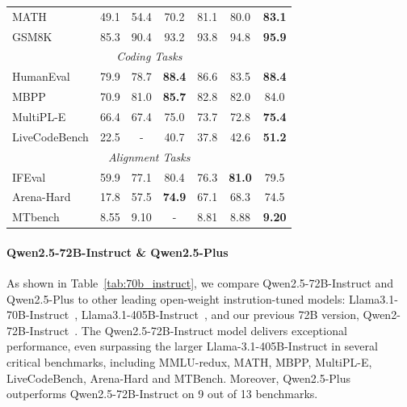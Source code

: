 \begin{table}[tbp]
\begin{tabular}{@{}lcccccc@{}}
MATH & 49.1 & 54.4 & 70.2 & 81.1 & 80.0 & \textbf{83.1} \\

GSM8K & 85.3 & 90.4 & 93.2 & 93.8 & 94.8 & \textbf{95.9} \\

\midrule

\multicolumn{7}{c}{\textit{Coding Tasks}} \\

\midrule

HumanEval & 79.9 & 78.7 & \textbf{88.4} & 86.6 & 83.5 & \textbf{88.4} \\

MBPP & 70.9 & 81.0 & \textbf{85.7} & 82.8 & 82.0 & 84.0 \\

MultiPL-E & 66.4 & 67.4 & 75.0 & 73.7 & 72.8 & \textbf{75.4} \\

LiveCodeBench & 22.5 & - & 40.7 & 37.8 & 42.6 & \textbf{51.2} \\

\midrule

\multicolumn{7}{c}{\textit{Alignment Tasks}} \\

\midrule

IFEval & 59.9 & 77.1 & 80.4 & 76.3 & \textbf{81.0} & 79.5 \\

Arena-Hard & 17.8 & 57.5 & \textbf{74.9} & 67.1 & 68.3 & 74.5 \\


MTbench & 8.55 & 9.10 & - & 8.81 & 8.88 & \textbf{9.20} \\

\bottomrule

\end{tabular}

\end{table}





\paragraph{Qwen2.5-72B-Instruct \& Qwen2.5-Plus} 
As shown in Table~\ref{tab:70b_instruct}, we compare Qwen2.5-72B-Instruct and Qwen2.5-Plus to other leading open-weight instrution-tuned models: Llama3.1-70B-Instruct~\citep{llama3}, Llama3.1-405B-Instruct~\citep{llama3}, and our previous 72B version, Qwen2-72B-Instruct~\citep{qwen2}. 
The Qwen2.5-72B-Instruct model delivers exceptional performance, even surpassing the larger Llama-3.1-405B-Instruct in several critical benchmarks, including MMLU-redux, MATH, MBPP, MultiPL-E, LiveCodeBench, Arena-Hard and MTBench.
Moreover, Qwen2.5-Plus outperforms Qwen2.5-72B-Instruct on 9 out of 13 benchmarks.






